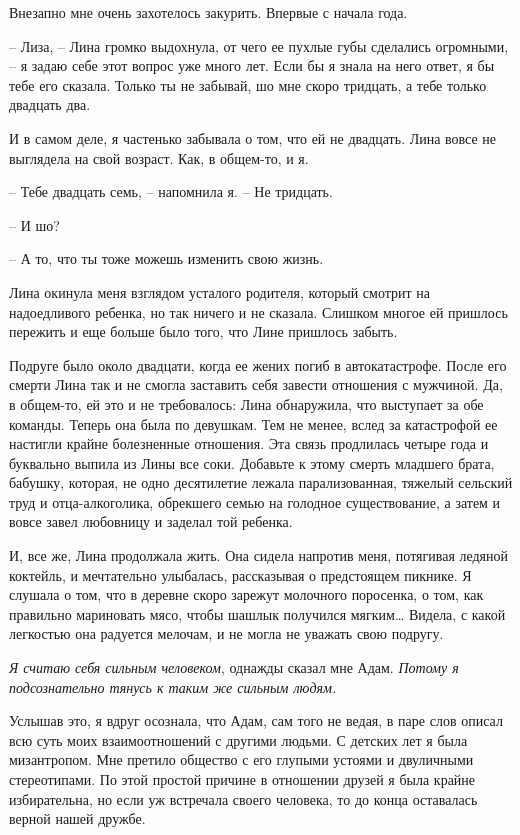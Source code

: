 \documentclass[
]{book}
\begin{document}
Внезапно мне очень захотелось закурить. Впервые с начала года.

-- Лиза, -- Лина громко выдохнула, от чего ее пухлые губы сделались огромными, -- я задаю себе этот вопрос уже много лет. Если бы я знала на него ответ, я бы тебе его сказала. Только ты не забывай, шо мне скоро тридцать, а тебе только двадцать два.

И в самом деле, я частенько забывала о том, что ей не двадцать. Лина вовсе не выглядела на свой возраст. Как, в общем-то, и я.

-- Тебе двадцать семь, -- напомнила я. -- Не тридцать.

-- И шо?

-- А то, что ты тоже можешь изменить свою жизнь.

Лина окинула меня взглядом усталого родителя, который смотрит на надоедливого ребенка, но так ничего и не сказала. Слишком многое ей пришлось пережить и еще больше было того, что Лине пришлось забыть.

Подруге было около двадцати, когда ее жених погиб в автокатастрофе. После его смерти Лина так и не смогла заставить себя завести отношения с мужчиной. Да, в общем-то, ей это и не требовалось: Лина обнаружила, что выступает за обе команды. Теперь она была по девушкам. Тем не менее, вслед за катастрофой ее настигли крайне болезненные отношения. Эта связь продлилась четыре года и буквально выпила из Лины все соки. Добавьте к этому смерть младшего брата, бабушку, которая, не одно десятилетие лежала парализованная, тяжелый сельский труд и отца-алкоголика, обрекшего семью на голодное существование, а затем и вовсе завел любовницу и заделал той ребенка.

И, все же, Лина продолжала жить. Она сидела напротив меня, потягивая ледяной коктейль, и мечтательно улыбалась, рассказывая о предстоящем пикнике. Я слушала о том, что в деревне скоро зарежут молочного поросенка, о том, как правильно мариновать мясо, чтобы шашлык получился мягким\ldots{} Видела, с какой легкостью она радуется мелочам, и не могла не уважать свою подругу.

\emph{Я считаю себя сильным человеком}, однажды сказал мне Адам. \emph{Потому я подсознательно тянусь к таким же сильным людям. }

Услышав это, я вдруг осознала, что Адам, сам того не ведая, в паре слов описал всю суть моих взаимоотношений с другими людьми. С детских лет я была мизантропом. Мне претило общество с его глупыми устоями и двуличными стереотипами. По этой простой причине в отношении друзей я была крайне избирательна, но если уж встречала своего человека, то до конца оставалась верной нашей дружбе.
\end{document}
